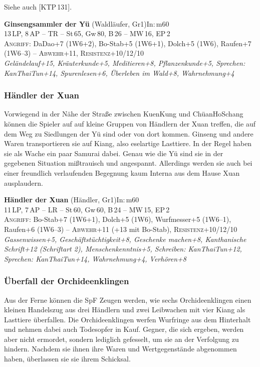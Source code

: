 \documentclass[
a4paper,
twoside,
DIV=calc,
BCOR=4mm,
fontsize=9pt,
twocolumn=on,
titlepage=on,
parskip=half
]{scrartcl}
\begin{document}
Siehe auch [KTP\,131].

\textbf{Ginsengsammler der Yü} (Waldläufer, Gr1)\hfill In:\,m60\\
13\,LP, 8\,AP -- TR -- St\,65, Gw\,80, B\,26 -- MW\,16, EP\,2\\
\textsc{Angriff:} DaDao+7 (1W6+2), Bo-Stab+5 (1W6+1), Dolch+5 (1W6),
Raufen+7 (1W6--3) -- \textsc{Abwehr}+11,
\textsc{Resistenz}+10/12/10\\
\emph{Geländelauf+15, Kräuterkunde+5, Meditieren+8, Pflanzenkunde+5,
  Sprechen: KanThaiTun+14, Spurenlesen+6, Überleben im Wald+8,
  Wahrnehmung+4}

\subsubsection{Händler der Xuan}

Vorwiegend in der Nähe der Straße zwischen KuenKung und ChüanHoSchang
können die Spieler auf auf kleine Gruppen von Händlern der Xuan
treffen, die auf dem Weg zu Siedlungen der Yü sind oder von dort
kommen. Ginseng und andere Waren transportieren sie auf Kiang, also
eselartige Lasttiere. In der Regel haben sie als Wache ein paar
Samurai dabei. Genau wie die Yü sind sie in der gegebenen Situation
mißtrauisch und angespannt. Allerdings werden sie auch bei einer
freundlich verlaufenden Begegnung kaum Interna aus dem Hause Xuan
ausplaudern.

\textbf{Händler der Xuan} (Händler, Gr1)\hfill In:\,m60\\
11\,LP, 7\,AP -- LR -- St\,60, Gw\,60, B\,24 -- MW\,15, EP\,2\\
\textsc{Angriff:} Bo-Stab+7 (1W6+1), Dolch+5 (1W6), Wurfmesser+5
(1W6--1), Raufen+6 (1W6--3) -- \textsc{Abwehr}+11 (+13 mit Bo-Stab),
\textsc{Resistenz}+10/12/10\\
\emph{Gassenwissen+5, Geschäftstüchtigkeit+8, Geschenke machen+8,
  Kanthanische Schrift+12 (Schriftart 2), Menschenkenntnis+5,
  Schreiben: KanThaiTun+12, Sprechen: KanThaiTun+14, Wahrnehmung+4,
  Verhören+8}

\subsubsection{Überfall der Orchideenklingen}

Aus der Ferne können die SpF Zeugen werden, wie sechs Orchideenklingen
einen kleinen Handelszug aus drei Händlern und zwei Leibwachen mit
vier Kiang als Lasttiere überfallen. Die Orchideenklingen werfen
Wurfringe aus dem Hinterhalt und nehmen dabei auch Todesopfer in
Kauf. Gegner, die sich ergeben, werden aber nicht ermordet, sondern
lediglich gefesselt, um sie an der Verfolgung zu hindern. Nachdem sie
ihnen ihre Waren und Wertgegenstände abgenommen haben, überlassen sie
sie ihrem Schicksal.
\end{document}
